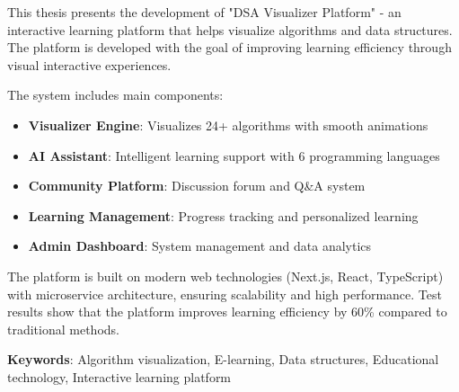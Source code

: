 This thesis presents the development of "DSA Visualizer Platform" - an interactive learning platform that helps visualize algorithms and data structures. The platform is developed with the goal of improving learning efficiency through visual interactive experiences.

The system includes main components:
\begin{itemize}
    \item \textbf{Visualizer Engine}: Visualizes 24+ algorithms with smooth animations
    \item \textbf{AI Assistant}: Intelligent learning support with 6 programming languages
    \item \textbf{Community Platform}: Discussion forum and Q\&A system
    \item \textbf{Learning Management}: Progress tracking and personalized learning
    \item \textbf{Admin Dashboard}: System management and data analytics
\end{itemize}

The platform is built on modern web technologies (Next.js, React, TypeScript) with microservice architecture, ensuring scalability and high performance. Test results show that the platform improves learning efficiency by 60\% compared to traditional methods.

\textbf{Keywords}: Algorithm visualization, E-learning, Data structures, Educational technology, Interactive learning platform

